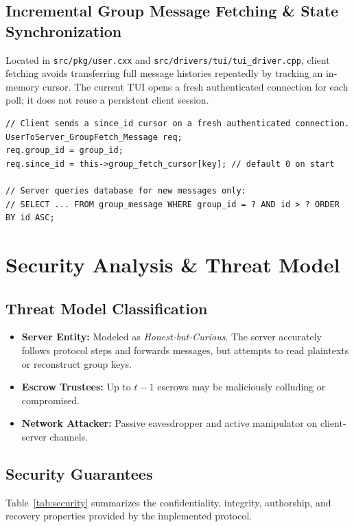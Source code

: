 \documentclass[11pt,a4paper]{article}
\begin{document}
\medskip
\subsection{Incremental Group Message Fetching \& State Synchronization}
Located in \texttt{src/pkg/user.cxx} and \texttt{src/drivers/tui/tui\_driver.cpp}, client fetching avoids transferring full message histories repeatedly by tracking an in-memory cursor. The current TUI opens a fresh authenticated connection for each poll; it does not reuse a persistent client session.

\begin{lstlisting}[caption={Incremental Fetch Logic in \texttt{UserClient}}]
// Client sends a since_id cursor on a fresh authenticated connection.
UserToServer_GroupFetch_Message req;
req.group_id = group_id;
req.since_id = this->group_fetch_cursor[key]; // default 0 on start

// Server queries database for new messages only:
// SELECT ... FROM group_message WHERE group_id = ? AND id > ? ORDER BY id ASC;
\end{lstlisting}

\section{Security Analysis \& Threat Model}
\label{sec:security}

\subsection{Threat Model Classification}
\begin{itemize}
	\item \textbf{Server Entity:} Modeled as \textit{Honest-but-Curious}. The server accurately follows protocol steps and forwards messages, but attempts to read plaintexts or reconstruct group keys.
	\item \textbf{Escrow Trustees:} Up to $t-1$ escrows may be maliciously colluding or compromised.
	\item \textbf{Network Attacker:} Passive eavesdropper and active manipulator on client-server channels.
\end{itemize}

\subsection{Security Guarantees}
Table~\ref{tab:security} summarizes the confidentiality, integrity, authorship, and recovery properties provided by the implemented protocol.
\end{document}
